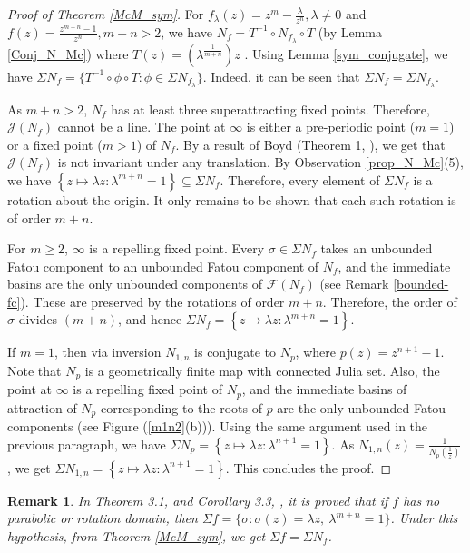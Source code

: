 \documentclass[12pt]{article}
\newtheorem{rem}{Remark}[section]
\numberwithin{equation}{section}
\begin{document}
\begin{proof}[Proof of Theorem \ref{McM_sym}]
	For  $f_\lambda(z)=z^m-\frac{\lambda}{z^n},	
	\lambda \neq 0$ and $f(z)=\frac{z^{m+n}-1}{z^n}, m+n>2$, we have
	$N_f=T^{-1}\circ N_{f_\lambda}\circ T$ (by Lemma \ref{Conj_N_Mc}) where $T(z)=(\lambda^{\frac{1}{m+n}})z$ . Using Lemma \ref{sym_conjugate}, we have $\Sigma N_f=\{T^{-1} \circ \phi \circ T: \phi \in \Sigma N_{f_\lambda} \}$. Indeed, it can be seen that  $\Sigma N_f= \Sigma N_{f_\lambda} $.
	
	
	As $m+n>2$, $N_f$ has at least three superattracting fixed points. Therefore, $\mathcal{J}(N_f)$ cannot be a line. The point at $\infty$ is either a pre-periodic point ($m=1$) or a fixed point ($m>1$) of $N_f$. By a result of Boyd (Theorem 1, \cite{Boyd2000}), we get that $\mathcal{J}(N_f)$ is not invariant under any translation. By Observation \ref{prop_N_Mc}(5), we have $\left\{z \mapsto \lambda z: \lambda^{m+n}=1\right\} \subseteq \Sigma N_f$.  Therefore, every element of $\Sigma N_f$ is a rotation about the origin. It only remains to be shown that each such rotation is of order $m+n$. 
	\par 
	For $m\geq 2$, $\infty$ is a repelling fixed point. Every $\sigma \in \Sigma N_f$ takes an unbounded Fatou component to an unbounded Fatou component of $N_f$, and the immediate basins are the only unbounded components of $\mathcal{F}(N_f)$ (see Remark \ref{bounded-fc}). These are preserved by the rotations of order $m+n$. Therefore, the order of $\sigma$ divides $(m+n)$, and hence $ \Sigma N_{f}=\left\{z \mapsto \lambda z: \lambda^{m+n}=1\right\}$.
	\par 
	If $m=1$, then via inversion $N_{1,n}$ is conjugate to $N_p$, where $p(z)=z^{n+1}-1$. Note that $N_p$ is a geometrically finite map with connected Julia set. Also, the point at $\infty$ is a repelling fixed point of $N_p$, and the immediate basins of attraction of $N_p$ corresponding to the roots of $p$ are the only unbounded Fatou components (see Figure (\ref{m1n2}(b))). Using the same argument used in the previous paragraph, we have $ \Sigma N_{p}=\left\{z \mapsto \lambda z: \lambda^{n+1}=1\right\}$. As $N_{1,n}(z)=\frac{1}{N_p(\frac{1}{z})}$, we get $ \Sigma N_{1,n}=\left\{z \mapsto \lambda z: \lambda^{n+1}=1\right\}$. This concludes the proof.
\end{proof}
\begin{rem}
	In Theorem 3.1, \cite{Ferreira2023} and Corollary 3.3,  \cite{Rot2024}, it is proved that if $f$ has no parabolic or rotation domain, then $\Sigma f=\{\sigma: \sigma(z)=\lambda z,~ \lambda^{m+n}=1\}$. Under this hypothesis, from Theorem \ref{McM_sym}, we get $\Sigma f=\Sigma N_f$.
\end{rem}
\end{document}
